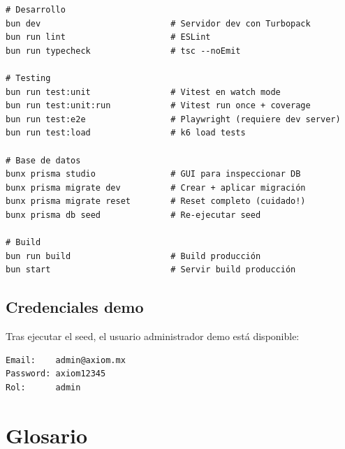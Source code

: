 \documentclass[10pt,a4paper,oneside]{report}
\begin{document}
\begin{lstlisting}[style=bash]
# Desarrollo
bun dev                          # Servidor dev con Turbopack
bun run lint                     # ESLint
bun run typecheck                # tsc --noEmit

# Testing
bun run test:unit                # Vitest en watch mode
bun run test:unit:run            # Vitest run once + coverage
bun run test:e2e                 # Playwright (requiere dev server)
bun run test:load                # k6 load tests

# Base de datos
bunx prisma studio               # GUI para inspeccionar DB
bunx prisma migrate dev          # Crear + aplicar migración
bunx prisma migrate reset        # Reset completo (cuidado!)
bunx prisma db seed              # Re-ejecutar seed

# Build
bun run build                    # Build producción
bun start                        # Servir build producción
\end{lstlisting}

\section{Credenciales demo}
Tras ejecutar el seed, el usuario administrador demo está disponible:

\begin{lstlisting}[style=bash]
Email:    admin@axiom.mx
Password: axiom12345
Rol:      admin
\end{lstlisting}

\chapter{Glosario}
\end{document}
